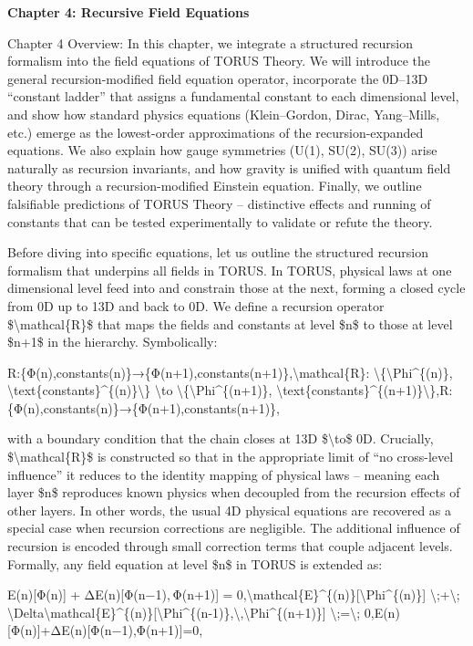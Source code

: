 \documentclass[]{article}
\date{}
\begin{document}
\textbf{Chapter 4: Recursive Field Equations}

Chapter 4 Overview: In this chapter, we integrate a structured recursion
formalism into the field equations of TORUS Theory. We will introduce
the general recursion-modified field equation operator, incorporate the
0D--13D ``constant ladder'' that assigns a fundamental constant to each
dimensional level, and show how standard physics equations
(Klein--Gordon, Dirac, Yang--Mills, etc.) emerge as the lowest-order
approximations of the recursion-expanded equations. We also explain how
gauge symmetries (U(1), SU(2), SU(3)) arise naturally as recursion
invariants, and how gravity is unified with quantum field theory through
a recursion-modified Einstein equation. Finally, we outline falsifiable
predictions of TORUS Theory -- distinctive effects and running of
constants that can be tested experimentally to validate or refute the
theory.

Before diving into specific equations, let us outline the structured
recursion formalism that underpins all fields in TORUS. In TORUS,
physical laws at one dimensional level feed into and constrain those at
the next, forming a closed cycle from 0D up to 13D and back to 0D. We
define a recursion operator \$\textbackslash{}mathcal\{R\}\$ that maps
the fields and constants at level \$n\$ to those at level \$n+1\$ in the
hierarchy. Symbolically:

R:\{Φ(n),constants(n)\}→\{Φ(n+1),constants(n+1)\},\textbackslash{}mathcal\{R\}:
\textbackslash{}\{\textbackslash{}Phi\^{}\{(n)\},
\textbackslash{}text\{constants\}\^{}\{(n)\}\textbackslash{}\}
\textbackslash{}to \textbackslash{}\{\textbackslash{}Phi\^{}\{(n+1)\},
\textbackslash{}text\{constants\}\^{}\{(n+1)\}\textbackslash{}\},R:\{Φ(n),constants(n)\}→\{Φ(n+1),constants(n+1)\},

with a boundary condition that the chain closes at 13D
\$\textbackslash{}to\$ 0D. Crucially, \$\textbackslash{}mathcal\{R\}\$
is constructed so that in the appropriate limit of ``no cross-level
influence'' it reduces to the identity mapping of physical laws --
meaning each layer \$n\$ reproduces known physics when decoupled from
the recursion effects of other layers. In other words, the usual 4D
physical equations are recovered as a special case when recursion
corrections are negligible. The additional influence of recursion is
encoded through small correction terms that couple adjacent levels.
Formally, any field equation at level \$n\$ in TORUS is extended as:

E(n){[}Φ(n){]}  +  ΔE(n){[}Φ(n−1), Φ(n+1){]}  =  0,\textbackslash{}mathcal\{E\}\^{}\{(n)\}{[}\textbackslash{}Phi\^{}\{(n)\}{]}
\textbackslash{};+\textbackslash{};
\textbackslash{}Delta\textbackslash{}mathcal\{E\}\^{}\{(n)\}{[}\textbackslash{}Phi\^{}\{(n-1)\},\textbackslash{},\textbackslash{}Phi\^{}\{(n+1)\}{]}
\textbackslash{};=\textbackslash{};
0,E(n){[}Φ(n){]}+ΔE(n){[}Φ(n−1),Φ(n+1){]}=0,
\end{document}
